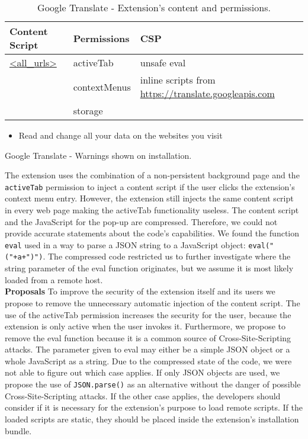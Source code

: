 	\begin{table}[h]
		\centering
		\begin{tabular}{|l|l|l|} \hline
			\textbf{Content Script} & \textbf{Permissions} & \textbf{CSP} \\ \hline
			\url{<all_urls>} & activeTab & unsafe eval \\
			 & contextMenus & inline scripts from \url{https://translate.googleapis.com} \\
			& storage & \\ \hline
		\end{tabular}
		\caption{Google Translate - Extension's content and permissions.}
	\end{table}
	
	\begin{listing}
		\begin{itemize}
			\item  Read and change all your data on the websites you visit
		\end{itemize}
		\caption{Google Translate - Warnings shown on installation.}
	\end{listing}
	
	The extension uses the combination of a non-persistent background page and the \texttt{activeTab} permission to inject a content script if the user clicks the extension's context menu entry. However, the extension still injects the same content script in every web page making the activeTab functionality useless. The content script and the JavaScript for the pop-up are compressed. Therefore, we could not provide accurate statements about the code's capabilities. We found the function \texttt{eval} used in a way to parse a JSON string to a JavaScript object: \texttt{eval("("+a+")")}. The compressed code restricted us to further investigate where the string parameter of the eval function originates, but we assume it is most likely loaded from a remote host. \\ %
	
	\textbf{Proposals} To improve the security of the extension itself and its users we propose to remove the unnecessary automatic injection of the content script. The use of the activeTab permission increases the security for the user, because the extension is only active when the user invokes it. Furthermore, we propose to remove the eval function because it is a common source of Cross-Site-Scripting attacks. The parameter given to eval may either be a simple JSON object or a whole JavaScript as a string. Due to the compressed state of the code, we were not able to figure out which case applies. If only JSON objects are used, we propose the use of \texttt{JSON.parse()} as an alternative without the danger of possible Cross-Site-Scripting attacks. If the other case applies, the developers should consider if it is necessary for the extension's purpose to load remote scripts. If the loaded scripts are static, they should be placed inside the extension's installation bundle. \\ %
	
